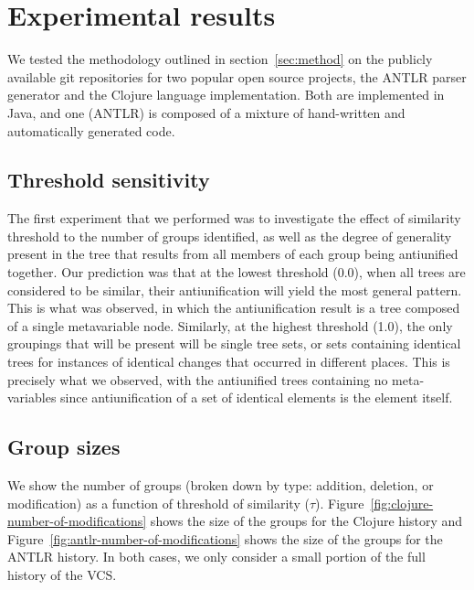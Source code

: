 \section{Experimental results}

We tested the methodology outlined in section~\ref{sec:method} on the
publicly available git repositories for two popular open source
projects, the ANTLR parser generator and the Clojure language implementation.
Both are implemented in Java, and one (ANTLR) is composed of a mixture of
hand-written and automatically generated code.  

\subsection{Threshold sensitivity}
\label{sec:threshold}

The first experiment that we performed was to investigate the effect of
similarity threshold to the number of groups identified, as well as the degree
of generality present in the tree that results from all members of each group
being antiunified together. Our prediction was that at the lowest threshold
(0.0), when all trees are considered to be similar, their antiunification will
yield the most general pattern.  This is what was observed, in which the
antiunification result is a tree composed of a single metavariable node.
Similarly, at the highest threshold (1.0), the only groupings that will be
present will be single tree sets, or sets containing identical trees for
instances of identical changes that occurred in different places.  This is
precisely what we observed, with the antiunified trees containing no meta-
variables since antiunification of a set of identical elements is the element
itself.

\subsection{Group sizes}
\label{sec:groups}
  
We show the number of groups (broken down by type: addition, deletion, or
modification) as a function of threshold of similarity ($\tau$).
Figure~\ref{fig:clojure-number-of-modifications} shows the size of the groups
for the Clojure history and Figure~\ref{fig:antlr-number-of-modifications}
shows the size of the groups for the ANTLR history. In both cases, we only
consider a small portion of the full history of the VCS.

